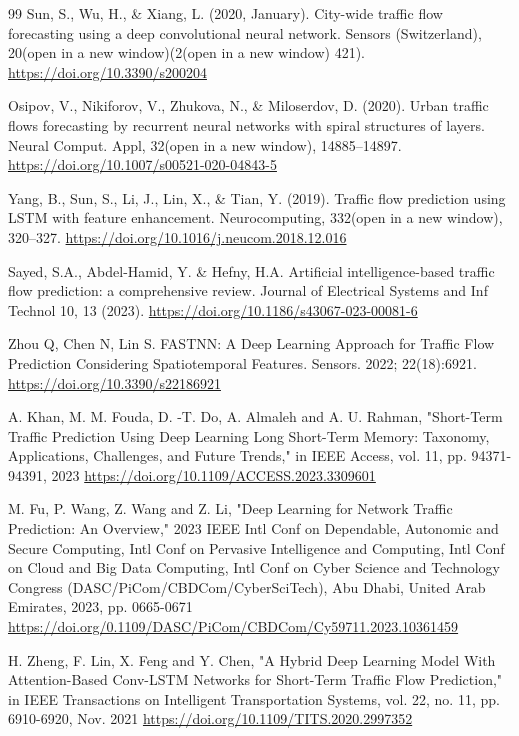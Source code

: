 \documentclass[conference]{IEEEtran}
\begin{document}
\begin{thebibliography}{99}
 Sun, S., Wu, H., \& Xiang, L. (2020, January). City-wide traffic flow forecasting using a deep convolutional neural network. Sensors (Switzerland), 20(open in a new window)(2(open in a new window) 421). \url{https://doi.org/10.3390/s200204}

 Osipov, V., Nikiforov, V., Zhukova, N., \& Miloserdov, D. (2020). Urban traffic flows forecasting by recurrent neural networks with spiral structures of layers. Neural Comput. Appl, 32(open in a new window), 14885–14897. \url{https://doi.org/10.1007/s00521-020-04843-5}

 Yang, B., Sun, S., Li, J., Lin, X., \& Tian, Y. (2019). Traffic flow prediction using LSTM with feature enhancement. Neurocomputing, 332(open in a new window), 320–327. \url{https://doi.org/10.1016/j.neucom.2018.12.016}

 Sayed, S.A., Abdel-Hamid, Y. \& Hefny, H.A. Artificial intelligence-based traffic flow prediction: a comprehensive review. Journal of Electrical Systems and Inf Technol 10, 13 (2023). \url{https://doi.org/10.1186/s43067-023-00081-6}

 Zhou Q, Chen N, Lin S. FASTNN: A Deep Learning Approach for Traffic Flow Prediction Considering Spatiotemporal Features. Sensors. 2022; 22(18):6921. 
 \url{https://doi.org/10.3390/s22186921}

 A. Khan, M. M. Fouda, D. -T. Do, A. Almaleh and A. U. Rahman, "Short-Term Traffic Prediction Using Deep Learning Long Short-Term Memory: Taxonomy, Applications, Challenges, and Future Trends," in IEEE Access, vol. 11, pp. 94371-94391, 2023 \url{https://doi.org/10.1109/ACCESS.2023.3309601}

 M. Fu, P. Wang, Z. Wang and Z. Li, "Deep Learning for Network Traffic Prediction: An Overview," 2023 IEEE Intl Conf on Dependable, Autonomic and Secure Computing, Intl Conf on Pervasive Intelligence and Computing, Intl Conf on Cloud and Big Data Computing, Intl Conf on Cyber Science and Technology Congress (DASC/PiCom/CBDCom/CyberSciTech), Abu Dhabi, United Arab Emirates, 2023, pp. 0665-0671 \url{https://doi.org/0.1109/DASC/PiCom/CBDCom/Cy59711.2023.10361459}

 H. Zheng, F. Lin, X. Feng and Y. Chen, "A Hybrid Deep Learning Model With Attention-Based Conv-LSTM Networks for Short-Term Traffic Flow Prediction," in IEEE Transactions on Intelligent Transportation Systems, vol. 22, no. 11, pp. 6910-6920, Nov. 2021 \url{https://doi.org/10.1109/TITS.2020.2997352}


\end{thebibliography}
\end{document}
